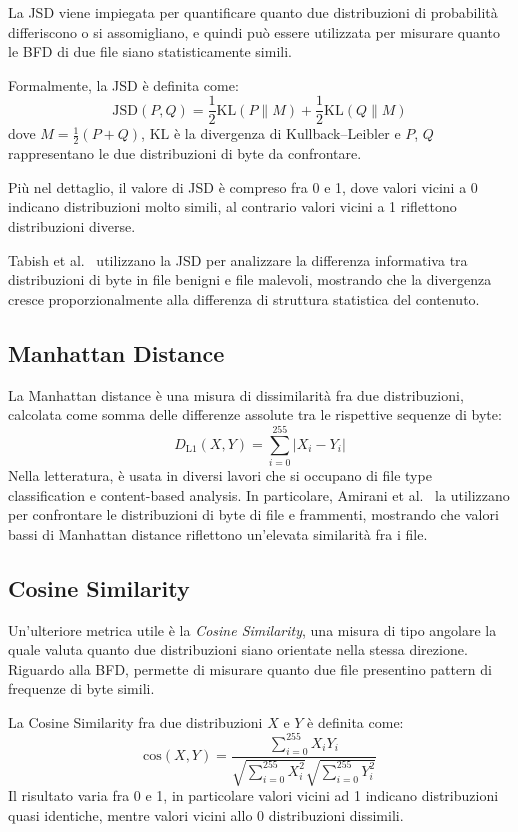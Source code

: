 \documentclass{report}
\begin{document}
La JSD viene impiegata per quantificare quanto due distribuzioni di probabilità differiscono o si assomigliano, e quindi può essere utilizzata per misurare quanto le BFD di due file siano statisticamente simili.

Formalmente, la JSD è definita come:
\[
\mathrm{JSD}(P,Q) = \frac{1}{2}\mathrm{KL}(P\|M) + \frac{1}{2}\mathrm{KL}(Q\|M)
\]
dove $M = \frac{1}{2}(P+Q)$, $\mathrm{KL}$ è la divergenza di Kullback–Leibler e $P$, $Q$ rappresentano le due distribuzioni di byte da confrontare.

Più nel dettaglio, il valore di JSD è compreso fra 0 e 1, dove valori vicini a 0 indicano distribuzioni molto simili, al contrario valori vicini a 1 riflettono distribuzioni diverse.

Tabish et al.~\cite{tabish2009malware} utilizzano la JSD per analizzare la differenza informativa tra distribuzioni di byte in file benigni e file malevoli, mostrando che la divergenza cresce proporzionalmente alla differenza di struttura statistica del contenuto.


\subsection{Manhattan Distance}

La Manhattan distance è una misura di dissimilarità fra due distribuzioni, calcolata come somma delle differenze assolute tra le rispettive sequenze di byte:
\[
D_{\mathrm{L1}}(X,Y) = \sum_{i=0}^{255} |X_i - Y_i|
\]
Nella letteratura, è usata in diversi lavori che si occupano di file type classification e content-based analysis.
In particolare, Amirani et al.~\cite{amirani2008content} la utilizzano per confrontare le distribuzioni di byte di file e frammenti, mostrando che valori bassi di Manhattan distance riflettono un’elevata similarità fra i file.

\subsection{Cosine Similarity}

Un’ulteriore metrica utile è la \emph{Cosine Similarity}, una misura di tipo angolare la quale valuta quanto due distribuzioni siano orientate nella stessa direzione.
Riguardo alla BFD, permette di misurare quanto due file presentino pattern di frequenze di byte simili.

La Cosine Similarity fra due distribuzioni $X$ e $Y$ è definita come:
\[
\mathrm{cos}(X,Y) = \frac{\sum_{i=0}^{255} X_i Y_i}{\sqrt{\sum_{i=0}^{255} X_i^2}\sqrt{\sum_{i=0}^{255} Y_i^2}}
\]
Il risultato varia fra 0 e 1, in particolare valori vicini ad 1 indicano distribuzioni quasi identiche, mentre valori vicini allo 0 distribuzioni dissimili.
\end{document}
